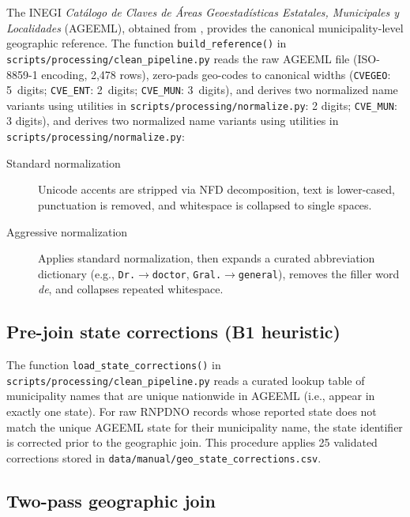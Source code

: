 \documentclass[3p]{elsarticle}
\begin{document}
The INEGI \emph{Catálogo de Claves de Áreas Geoestadísticas
Estatales, Municipales y Localidades} (AGEEML), obtained from
\cite{inegi_ageeml}, provides the canonical municipality-level
geographic reference.
The function \texttt{build\_reference()} in
\texttt{scripts/\allowbreak{}processing/\allowbreak{}clean\_pipeline.py}
reads the raw AGEEML file (ISO-8859-1 encoding, 2{,}478 rows),
zero-pads geo-codes to canonical widths
(\texttt{CVEGEO}: 5~digits; \texttt{CVE\_ENT}: 2~digits;
\texttt{CVE\_MUN}: 3~digits), and derives two normalized
name variants using utilities in
\texttt{scripts/\allowbreak{}processing/\allowbreak{}normalize.py}:         
  2 digits; \texttt{CVE\_MUN}: 3 digits), and derives two normalized       
  name variants using utilities in                                         
  \texttt{scripts/processing/normalize.py}:


\begin{description}
  \item[Standard normalization]
    Unicode accents are stripped via NFD decomposition,
    text is lower-cased, punctuation is removed, and
    whitespace is collapsed to single spaces.

  \item[Aggressive normalization]
    Applies standard normalization, then expands a curated
    abbreviation dictionary
    (e.g., \texttt{Dr.}$\to$\texttt{doctor},
    \texttt{Gral.}$\to$\texttt{general}),
    removes the filler word \emph{de}, and collapses
    repeated whitespace.
\end{description}  

\subsection*{Pre-join state corrections (B1 heuristic)}

  The function \texttt{load\_state\_corrections()} in 
  \texttt{scripts/processing/clean\_pipeline.py} reads a curated
  lookup table of municipality names that are unique nationwide in         
  AGEEML (i.e., appear in exactly one state).                              
  For raw RNPDNO records whose reported state does not match the
  unique AGEEML state for their municipality name, the state               
  identifier is corrected prior to the geographic join.                    
  This procedure applies 25 validated corrections stored in
  \texttt{data/manual/geo\_state\_corrections.csv}.   

\subsection*{Two-pass geographic join}
\end{document}
